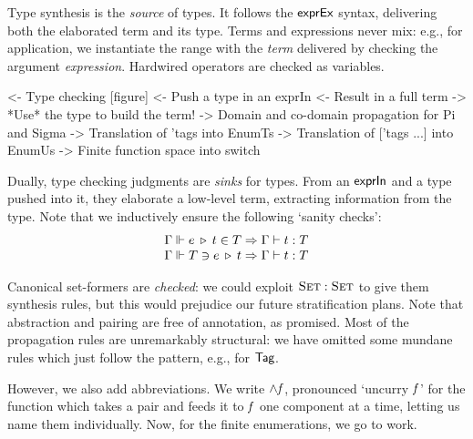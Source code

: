 Type synthesis is the \emph{source} of types. It follows the \(\textsf{exprEx}\)
syntax, delivering both the elaborated term and its type. Terms
and expressions never mix: e.g., for application, we
instantiate the range with the \emph{term} delivered by checking the
argument \emph{expression}. Hardwired operators are checked as variables.


%



\begin{wstructure}
<- Type checking [figure]
    <- Push a type in an exprIn
    <- Result in a full term
    -> *Use* the type to build the term!
        -> Domain and co-domain propagation for Pi and Sigma
        -> Translation of 'tags into EnumTs
        -> Translation of ['tags ...] into EnumUs
        -> Finite function space into switch
\end{wstructure}

Dually, type checking judgments
are \emph{sinks} for types. From an
$\textsf{exprIn}$ and a type pushed into it, they elaborate a low-level
term, extracting information from the type. Note that we inductively ensure the following `sanity checks':
%
\[\stkc{
\Gamma\Vdash\propag{e}{\pull{t}{T}} \Rightarrow
  \Gamma\vdash t:T \\
\Gamma\Vdash\push{\propag{e}{t}}{T} \Rightarrow
  \Gamma\vdash t:T
}\]

Canonical set-formers are \emph{checked}: we could exploit
\(\Set:\Set\) to give them synthesis rules, but this would prejudice
our future stratification plans. Note that abstraction and pairing are
free of annotation, as promised. Most of the propagation rules are
unremarkably structural: we have omitted some mundane rules which just
follow the pattern, e.g., for \(\UId\).



However, we also add abbreviations. We write \(\spl{\M{f}}\),
pronounced `uncurry \(\mathit{f}\)' for the function which takes a pair and
feeds it to \(\mathit{f}\) one component at a time, letting us name
them individually. Now, for the finite enumerations, we go to work.

